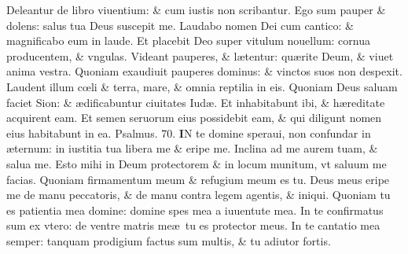 \documentclass[a5paper,10pt]{book}
\def\ae{æ}
\def\oe{œ}
\begin{document}
\begin{multicols*}{2}
\newline \color{red} D\color{black}eleantur de libro viuentium: \& cum iustis non scribantur.
\newline \color{red} E\color{black}go sum pauper \& dolens: salus tua Deus suscepit me.
\newline \color{red} L\color{black}audabo nomen Dei cum cantico: \& magnificabo eum in laude.
\newline \color{red} E\color{black}t placebit Deo super vitulum nouellum: cornua producentem, \& vngulas.
\newline \color{red} V\color{black}ideant pauperes, \& l\ae tentur: qu\ae rite Deum, \& viuet anima vestra.
\newline \color{red} Q\color{black}uoniam exaudiuit pauperes dominus: \& vinctos suos non despexit.
\newline \color{red} L\color{black}audent illum c\oe li \& terra, mare, \& omnia reptilia in eis.
\newline \color{red} Q\color{black}uoniam Deus saluam faciet Sion: \& \ae dificabuntur ciuitates Iud\ae .
\newline \color{red} E\color{black}t inhabitabunt ibi, \& h\ae reditate acquirent eam.
\newline \color{red} E\color{black}t semen seruorum eius possidebit eam, \& qui diligunt nomen eius habitabunt in ea. \quad \color{red} Psalmus. 70. \color{black}
\vspace{-1em}
\lettrine[lines=2]{\bfseries \color{red} I}{}N te domine speraui, non confundar in \ae ternum: in iustitia tua libera me \& eripe me.
\newline \color{red} I\color{black}nclina ad me aurem tuam, \& salua me.
\newline \color{red} E\color{black}sto mihi in Deum protectorem \& in locum munitum, vt saluum me facias.
\newline \color{red} Q\color{black}uoniam firmamentum meum \& refugium meum es tu.
\newline \color{red} D\color{black}eus meus eripe me de manu peccatoris, \& de manu contra legem agentis, \& iniqui.
\newline \color{red} Q\color{black}uoniam tu es patientia mea domine: domine spes mea a iuuentute mea.
\newline \color{red} I\color{black}n te confirmatus sum ex vtero: de ventre matris me\ae \ tu es protector meus.
\newline \color{red} I\color{black}n te cantatio mea semper: tanquam prodigium factus sum multis, \& tu adiutor fortis.

\end{multicols*}
\end{document}
